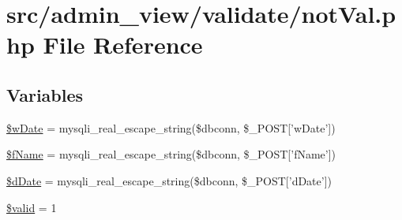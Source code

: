 \hypertarget{notVal_8php}{\section{src/admin\-\_\-view/validate/not\-Val.php \-File \-Reference}
\label{notVal_8php}
}
\subsection*{\-Variables}
\begin{DoxyCompactItemize}
\item 
\hyperlink{notVal_8php_a2f5503c6585d6fbb4b023dae019db907}{\$w\-Date} = mysqli\-\_\-real\-\_\-escape\-\_\-string(\$dbconn, \$\-\_\-\-P\-O\-S\-T\mbox{[}'w\-Date'\mbox{]})
\item 
\hyperlink{notVal_8php_a3522d7ff10b2bf62bcc19a71f65a3617}{\$f\-Name} = mysqli\-\_\-real\-\_\-escape\-\_\-string(\$dbconn, \$\-\_\-\-P\-O\-S\-T\mbox{[}'f\-Name'\mbox{]})
\item 
\hyperlink{notVal_8php_abeb8d972c22c8bdcb5e9a7ce034cf93e}{\$d\-Date} = mysqli\-\_\-real\-\_\-escape\-\_\-string(\$dbconn, \$\-\_\-\-P\-O\-S\-T\mbox{[}'d\-Date'\mbox{]})
\item 
\hyperlink{notVal_8php_a0587674d27d00ef497e08e53ccf45bbb}{\$valid} = 1
\end{DoxyCompactItemize}


